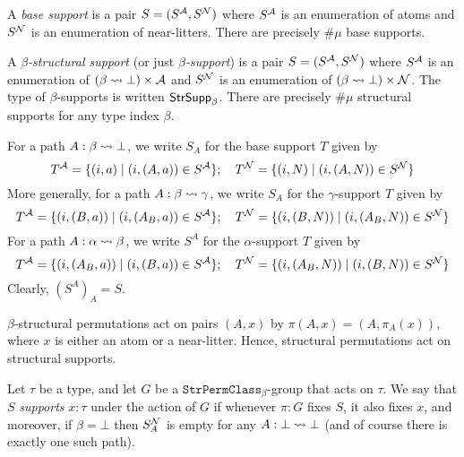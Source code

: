 \begin{definition}
  \label{def:BaseSupport}
  A \emph{base support} is a pair \( S = (S^{\mathcal A}, S^{\mathcal N}) \) where \( S^{\mathcal A} \) is an enumeration of atoms and \( S^{\mathcal N} \) is an enumeration of near-litters.
  There are precisely \( \#\mu \) base supports.
\end{definition}
\begin{definition}
  \label{def:StrSupport}
  A \emph{\( \beta \)-structural support} (or just \emph{\( \beta \)-support}) is a pair \( S = (S^{\mathcal A}, S^{\mathcal N}) \) where \( S^{\mathcal A} \) is an enumeration of \( (\beta \rightsquigarrow \bot) \times {\mathcal A} \) and \( S^{\mathcal N} \) is an enumeration of \( (\beta \rightsquigarrow \bot) \times {\mathcal N} \).
  The type of \( \beta \)-supports is written \( \mathsf{StrSupp}_\beta \).
  There are precisely \( \#\mu \) structural supports for any type index \( \beta \).

  For a path \( A : \beta \rightsquigarrow \bot \), we write \( S_A \) for the base support \( T \) given by
  \[ T^{\mathcal A} = \{ (i, a) \mid (i, (A, a)) \in S^{\mathcal A} \};\quad T^{\mathcal N} = \{ (i, N) \mid (i, (A, N)) \in S^{\mathcal N} \} \]
  More generally, for a path \( A : \beta \rightsquigarrow \gamma \), we write \( S_A \) for the \( \gamma \)-support \( T \) given by
  \[ T^{\mathcal A} = \{ (i, (B, a)) \mid (i, (A_B, a)) \in S^{\mathcal A} \};\quad T^{\mathcal N} = \{ (i, (B, N)) \mid (i, (A_B, N)) \in S^{\mathcal N} \} \]
  For a path \( A : \alpha \rightsquigarrow \beta \), we write \( S^A \) for the \( \alpha \)-support \( T \) given by
  \[ T^{\mathcal A} = \{ (i, (A_B, a)) \mid (i, (B, a)) \in S^{\mathcal A} \};\quad T^{\mathcal N} = \{ (i, (A_B, N)) \mid (i, (B, N)) \in S^{\mathcal N} \} \]
  Clearly, \( (S^A)_A = S \).

  \( \beta \)-structural permutations act on pairs \( (A, x) \) by \( \pi(A, x) = (A, \pi_A(x)) \), where \( x \) is either an atom or a near-litter.
  Hence, structural permutations act on structural supports.

  Let \( \tau \) be a type, and let \( G \) be a \( \texttt{StrPermClass}_\beta \)-group that acts on \( \tau \).
  We say that \( S \) \emph{supports} \( x : \tau \) under the action of \( G \) if whenever \( \pi : G \) fixes \( S \), it also fixes \( x \), and moreover, if \( \beta = \bot \) then \( S_A^{\mathcal N} \) is empty for any \( A : \bot \rightsquigarrow \bot \) (and of course there is exactly one such path).
\end{definition}
